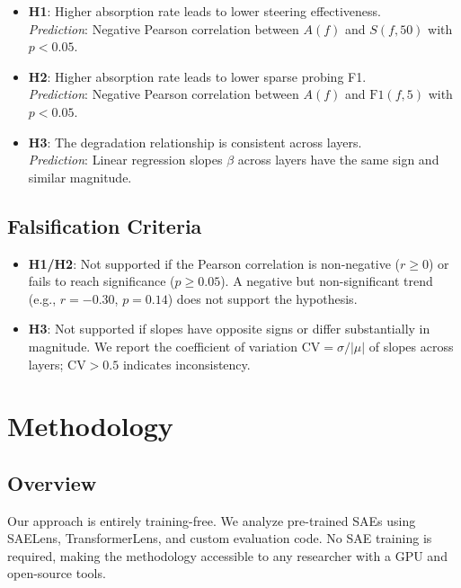 \documentclass{article}
\begin{document}
\begin{itemize}
    \item \textbf{H1}: Higher absorption rate leads to lower steering effectiveness.\\
    \textit{Prediction}: Negative Pearson correlation between $A(f)$ and $S(f, 50)$ with $p < 0.05$.
    \item \textbf{H2}: Higher absorption rate leads to lower sparse probing F1.\\
    \textit{Prediction}: Negative Pearson correlation between $A(f)$ and $\text{F1}(f, 5)$ with $p < 0.05$.
    \item \textbf{H3}: The degradation relationship is consistent across layers.\\
    \textit{Prediction}: Linear regression slopes $\beta$ across layers have the same sign and similar magnitude.
\end{itemize}

\subsection{Falsification Criteria}

\begin{itemize}
    \item \textbf{H1/H2}: Not supported if the Pearson correlation is non-negative ($r \geq 0$) or fails to reach significance ($p \geq 0.05$). A negative but non-significant trend (e.g., $r = -0.30$, $p = 0.14$) does not support the hypothesis.
    \item \textbf{H3}: Not supported if slopes have opposite signs or differ substantially in magnitude. We report the coefficient of variation $\text{CV} = \sigma / |\mu|$ of slopes across layers; $\text{CV} > 0.5$ indicates inconsistency.
\end{itemize}

\section{Methodology}
\label{sec:methodology}

\subsection{Overview}

Our approach is entirely training-free. We analyze pre-trained SAEs using SAELens, TransformerLens, and custom evaluation code. No SAE training is required, making the methodology accessible to any researcher with a GPU and open-source tools.
\end{document}
